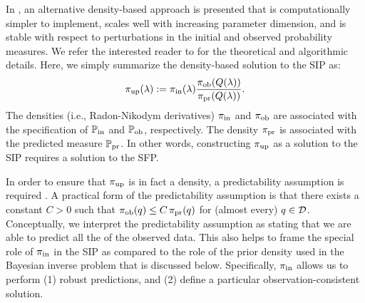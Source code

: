 In \cite{BJW18a}, an alternative density-based approach is presented that is computationally simpler to implement, scales well with increasing parameter dimension, and is stable with respect to perturbations in the initial and observed probability measures.
We refer the interested reader to \cite{BJW18a} for the theoretical and algorithmic details.
Here, we simply summarize the density-based solution to the SIP as:
\begin{equation}\label{eq:updated-pdf}
	\operatorname*{\pi_{up}}(\lambda) := \operatorname*{\pi_{in}}(\lambda)\frac{\operatorname*{\pi_{ob}}(Q(\lambda))}{\operatorname*{\pi_{pr}}(Q(\lambda))}.
\end{equation}
The densities (i.e., Radon-Nikodym derivatives) $\operatorname*{\pi_{in}}$ and $\operatorname*{\pi_{ob}}$ are associated with the specification of $\operatorname*{\mathbb{P}_{in}}$ and $\operatorname*{\mathbb{P}_{ob}}$, respectively.
The density $\operatorname*{\pi_{pr}}$ is associated with the predicted measure $\operatorname*{\mathbb{P}_{pr}}$.
In other words, constructing $\operatorname*{\pi_{up}}$ as a solution to the SIP requires a solution to the SFP.

In order to ensure that $\operatorname*{\pi_{up}}$ is in fact a density, a predictability assumption is required \cite{BJW18a}.
A practical form of the predictability assumption is that there exists a constant $C>0$ such that $\operatorname*{\pi_{ob}}(q)\leq C\operatorname*{\pi_{pr}}(q)$ for (almost every) $q\in\mathcal{D}$.
Conceptually, we interpret the predictability assumption as stating that we are able to predict all the of the observed data.
This also helps to frame the special role of $\operatorname*{\pi_{in}}$ in the SIP as compared to the role of the prior density used in the Bayesian inverse problem that is discussed below.
Specifically, $\operatorname*{\pi_{in}}$ allows us to perform (1) robust predictions, and (2) define a particular observation-consistent solution.

\vfill
